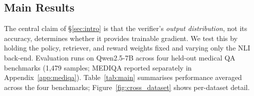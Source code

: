 \documentclass[11pt]{article}
\begin{document}

\subsection{Main Results}
\label{sec:main_results}
The central claim of \S\ref{sec:intro} is that the verifier's \emph{output distribution}, not its accuracy, determines whether it provides trainable gradient. We test this by holding the policy, retriever, and reward weights fixed and varying only the NLI back-end. Evaluation runs on Qwen2.5-7B across four held-out medical QA benchmarks (1{,}479 samples; MEDIQA reported separately in Appendix~\ref{app:mediqa}). Table~\ref{tab:main} summarises performance averaged across the four benchmarks; Figure~\ref{fig:cross_dataset} shows per-dataset detail.
\end{document}
